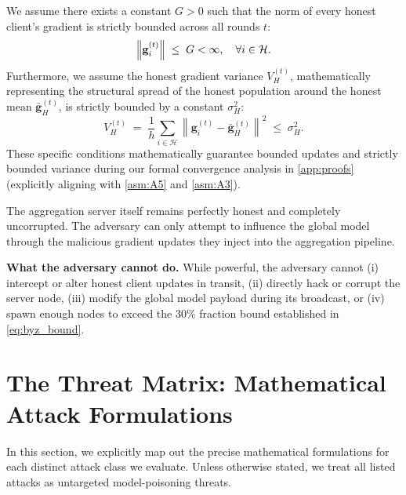 \documentclass[../main]{subfiles}
\begin{document}
\begin{assumption}
\label{asm:grad_bound}
We assume there exists a constant $G > 0$ such that the norm of every honest client's gradient is strictly bounded across all rounds $t$:
\begin{equation}
    \left\| \mathbf{g}_{i}^{(t)} \right\| \;\leq\; G < \infty, \quad \forall i \in \mathcal{H}.
    \label{eq:grad_bound}
\end{equation}
Furthermore, we assume the honest gradient variance $V_H^{(t)}$, mathematically representing the structural spread of the honest population around the honest mean $\bar{\mathbf{g}}_H^{(t)}$, is strictly bounded by a constant $\sigma_H^2$:
\begin{equation}
    V_H^{(t)} \;=\; \frac{1}{h} \sum_{i \in \mathcal{H}} \left\|\mathbf{g}_i^{(t)} - \bar{\mathbf{g}}_H^{(t)}\right\|^2 \;\leq\; \sigma_H^2.
\end{equation}
These specific conditions mathematically guarantee bounded updates and strictly bounded variance during our formal convergence analysis in \cref{app:proofs} (explicitly aligning with \cref{asm:A5} and \cref{asm:A3}).
\end{assumption}

\begin{assumption}
\label{asm:server}
The aggregation server itself remains perfectly honest and completely uncorrupted. The adversary can only attempt to influence the global model through the malicious gradient updates they inject into the aggregation pipeline.
\end{assumption}

\textbf{What the adversary cannot do.} While powerful, the adversary cannot (i) intercept or alter honest client updates in transit, (ii) directly hack or corrupt the server node, (iii) modify the global model payload during its broadcast, or (iv) spawn enough nodes to exceed the 30\% fraction bound established in \eqref{eq:byz_bound}.

\section{The Threat Matrix: Mathematical Attack Formulations}
\label{sec:threat_matrix}

In this section, we explicitly map out the precise mathematical formulations for each distinct attack class we evaluate. Unless otherwise stated, we treat all listed attacks as untargeted model-poisoning threats.
\end{document}
